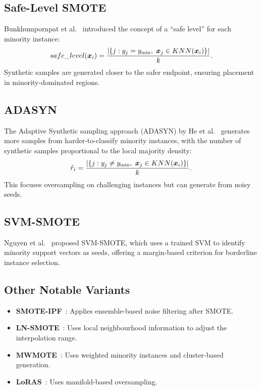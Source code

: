 \subsection{Safe-Level SMOTE}
\label{sec:lit:safelevel}

Bunkhumpornpat et al.~\cite{bunkhumpornpat2009safe} introduced the concept of a ``safe level'' for each minority instance:
\begin{equation}
  safe\_level(\bm{x}_i) = \frac{|\{j : y_j = y_{\min},\; \bm{x}_j \in KNN(\bm{x}_i)\}|}{k}.
\end{equation}
Synthetic samples are generated closer to the safer endpoint, ensuring placement in minority-dominated regions.

\subsection{ADASYN}
\label{sec:lit:adasyn}

The Adaptive Synthetic sampling approach (ADASYN) by He et al.~\cite{he2008adasyn} generates more samples from harder-to-classify minority instances, with the number of synthetic samples proportional to the local majority density:
\begin{equation}
  \hat{r}_i = \frac{|\{j : y_j \neq y_{\min},\; \bm{x}_j \in KNN(\bm{x}_i)\}|}{k}.
\end{equation}
This focuses oversampling on challenging instances but can generate from noisy seeds.

\subsection{SVM-SMOTE}

Nguyen et al.~\cite{nguyen2011borderline} proposed SVM-SMOTE, which uses a trained SVM to identify minority support vectors as seeds, offering a margin-based criterion for borderline instance selection.

\subsection{Other Notable Variants}

\begin{itemize}[leftmargin=*]
  \item \textbf{SMOTE-IPF}~\cite{saez2015smote}: Applies ensemble-based noise filtering after SMOTE.
  \item \textbf{LN-SMOTE}~\cite{maciejewski2011local}: Uses local neighbourhood information to adjust the interpolation range.
  \item \textbf{MWMOTE}~\cite{barua2014mwmote}: Uses weighted minority instances and cluster-based generation.
  \item \textbf{LoRAS}~\cite{bej2021loras}: Uses manifold-based oversampling.
\end{itemize}


